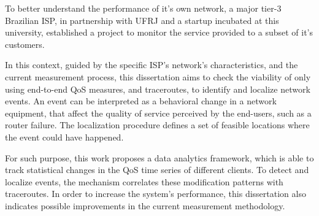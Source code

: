 To better understand the performance of it's own network, a major
tier-3 Brazilian ISP, in partnership with UFRJ and a startup incubated at this
university,
established a project to monitor the service provided to a subset
of it's customers.

In this context, guided by the specific ISP's network's characteristics,
and the current measurement process,
this dissertation aims to check the viability of
only using end-to-end QoS measures, and traceroutes,
to identify and localize network events. An event can be interpreted as a
behavioral change in a network equipment, that affect the quality of service
perceived by the end-users,
such as a router failure. The localization procedure defines a set of
feasible locations where the event could have happened.

For such purpose, this work proposes a data analytics framework, which is able
to track statistical changes in the QoS time series of different
clients.
To detect and localize events, the mechanism correlates these modification
patterns with traceroutes.
In order to increase the system's performance,
this dissertation also indicates possible improvements in the current
measurement methodology.
